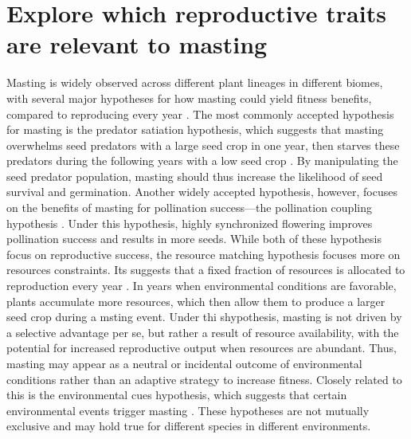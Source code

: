 \documentclass[11pt,letter]{article}
\begin{document}
\section{Explore which reproductive traits are relevant to masting}
Masting is widely observed across different plant lineages in different biomes, with several major hypotheses for how masting could yield fitness benefits, compared to reproducing every year \citep{koenig2021brief, waller1979models}. The most commonly accepted hypothesis for masting is the predator satiation hypothesis, which suggests that masting overwhelms seed predators with a large seed crop in one year, then starves these predators during the following years with a low seed crop \citep{janzen1971seed}. By manipulating the seed predator population, masting should thus increase the likelihood of seed survival and germination. Another widely accepted hypothesis, however, focuses on the benefits of masting for pollination success---the pollination coupling hypothesis \citep{crone2014resource}. Under this hypothesis, highly synchronized flowering improves pollination success and results in more seeds. While both of these hypothesis focus on reproductive success, the resource matching hypothesis focuses more on resources constraints. Its suggests that a fixed fraction of resources is allocated to reproduction every year \citep{kelly1994evolutionary}. In years when environmental conditions are favorable, plants accumulate more resources, which then allow them to produce a larger seed crop during a msting event. Under thi shypothesis, masting is not driven by a selective advantage per se, but rather a result of resource availability, with the potential for increased reproductive output when resources are abundant. Thus, masting may appear as a neutral or incidental outcome of environmental conditions rather than an adaptive strategy to increase fitness. Closely related to this is the environmental cues hypothesis, which suggests that certain environmental events trigger masting \citep{pearse2016mechanisms}. These hypotheses are not mutually exclusive and may hold true for different species in different environments.\par
\end{document}
